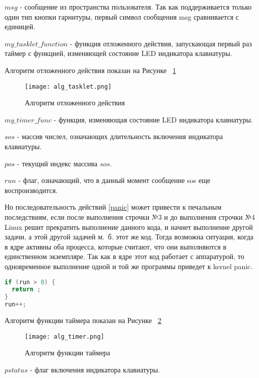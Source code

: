 $msg$ - сообщение из пространства пользователя. Так как поддерживается только один тип кнопки гарнитуры, первый символ сообщения msg сравнивается с единицей.

$my\_tasklet\_function$ - функция отложенного действия, запускающая первый раз таймер с функцией, изменяющей состояние LED индикатора клавиатуры.

Алгоритм отложенного действия показан на Рисунке ~\ref{image:alg_tasklet}

\begin{figure}[h]
  \centering
  \texttt{[image: alg\_tasklet.png]}
  \caption{Алгоритм отложенного действия}
  \label{image:alg_tasklet}
\end{figure}

$my\_timer\_func$ - функция, изменяющая состояние LED индикатора клавиатуры.

$sos$ - массив числел, означающих длительность включения индикатора клавиатуры.

$pos$ - текущий индекс массива $sos$.

$run$ - флаг, означающий, что в данный момент сообщение sos еще воспроизводится.

Но последовательность действий \ref{panic} может привести к печальным последствиям, если после выполнения строчки №3 и до выполнения строчки №4 Linux решит прекратить выполнение данного кода, и начнет выполнение другой задачи, а этой другой задачей м.~б. этот же код. Тогда возможна ситуация, когда в ядре активны оба процесса, которые считают, что они выполняются в единственном экземпляре. Так как в ядре этот код работает с аппаратурой, то одновременное выполнение одной и той же программы приведет к kernel panic. 

\begin{lstlisting}[language=C,caption={Опасный код},label=panic]
if (run > 0) {
  return ;
}
run++;
\end{lstlisting}

Алгоритм функции таймера показан на Рисунке ~\ref{image:alg_timer}

\begin{figure}[h]
  \centering
  \texttt{[image: alg\_timer.png]}
  \caption{Алгоритм функции таймера}
  \label{image:alg_timer}
\end{figure}

$pstatus$ - флаг включения индикатора клавиатуры.



